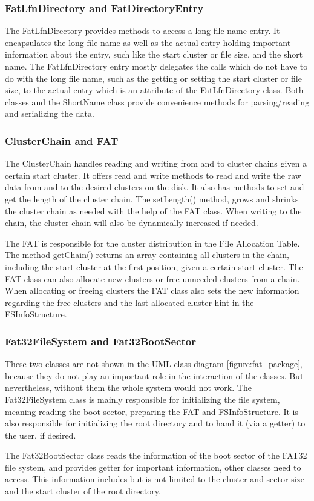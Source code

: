 \subsubsection{FatLfnDirectory and FatDirectoryEntry}

The FatLfnDirectory provides methods to access a long file name entry. It encapsulates the long file name as well as the actual entry holding important information about the entry, such like the start cluster or file size, and the short name. The FatLfnDirectory entry mostly delegates the calls which do not have to do with the long file name, such as the getting or setting the start cluster or file size, to the actual entry which is an attribute of the FatLfnDirectory class. Both classes and the ShortName class provide convenience methods for parsing/reading and serializing the data. 

\subsubsection{ClusterChain and FAT}

The ClusterChain handles reading and writing from and to cluster chains given a certain start cluster. It offers read and write methods to read and write the raw data from and to the desired clusters on the disk. It also has methods to set and get the length of the cluster chain. The setLength() method, grows and shrinks the cluster chain as needed with the help of the FAT class. When writing to the chain, the cluster chain will also be dynamically increased if needed.

The FAT is responsible for the cluster distribution in the File Allocation Table. The method getChain() returns an array containing all clusters in the chain, including the start cluster at the first position, given a certain start cluster. The FAT class can also allocate new clusters or free unneeded clusters from a chain. When allocating or freeing clusters the FAT class also sets the new information regarding the free clusters and the last allocated cluster hint in the FSInfoStructure.

\subsubsection{Fat32FileSystem and Fat32BootSector}

These two classes are not shown in the UML class diagram \ref{figure:fat_package}, because they do not play an important role in the interaction of the classes. But nevertheless, without them the whole system would not work. The Fat32FileSystem class is mainly responsible for initializing the file system, meaning reading the boot sector, preparing the FAT and FSInfoStructure. It is also responsible for initializing the root directory and to hand it (via a getter) to the user, if desired.

The Fat32BootSector class reads the information of the boot sector of the FAT32 file system, and provides getter for important information, other classes need to access. This information includes but is not limited to the cluster and sector size and the start cluster of the root directory.
